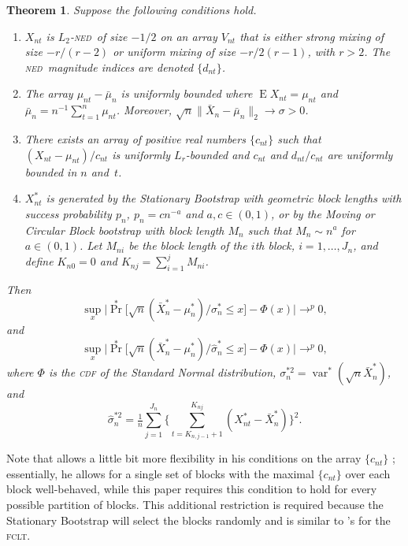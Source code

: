 \documentclass[11pt]{article}
\newcommand\citepos[2][]{\citeauthor{#2}'s \citeyearpar[#1]{#2}}
\newtheorem{thm}{Theorem}
\theoremstyle{definition}
\DeclareMathOperator{\E}{E}
\DeclareMathOperator{\pr}{Pr}
\DeclareMathOperator{\var}{var}
\newcommand{\fclt}{\textsc{fclt}}
\newcommand{\ned}{\textsc{ned}}
\begin{document}
\begin{thm}\label{thm:1}
  Suppose the following conditions hold.
  \begin{enumerate}
  \item $X_{nt}$ is $L_2$-\ned\ of size $-1/2$ on an array
    $V_{nt}$ that is either strong mixing of size $-r/(r-2)$ or
    uniform mixing of size $-r/2(r-1)$, with $r > 2$.  The
    \ned\ magnitude indices are denoted $\{d_{nt}\}$.
  \item The array $\mu_{nt} - \bar \mu_n$ is uniformly bounded where
    $\E X_{nt} = \mu_{nt}$ and $\bar{\mu}_n = n^{-1} \sum_{t=1}^n
    \mu_{nt}$.  Moreover, $\sqrt{n} \| \bar{X}_{n} - \bar\mu_n \|_2
    \to \sigma > 0$.
  \item There exists an array of positive real numbers $\{c_{nt}\}$
    such that $(X_{nt} - \mu_{nt})/c_{nt}$ is uniformly $L_r$-bounded
    and $c_{nt}$ and $d_{nt}/c_{nt}$ are uniformly bounded in $n$
    and~$t$.
  \item $X_{nt}^{*}$ is generated by the Stationary Bootstrap with
    geometric block lengths with success probability $p_n$, $p_n = c
    n^{-a}$ and $a,c \in (0,1)$, or by the Moving or Circular Block
    bootstrap with block length $M_n$ such that $M_n \sim n^a$ for 
    $a \in (0,1)$.  Let $M_{ni}$ be the block length of the $i$th
    block, $i=1,\dots,J_n$, and define $K_{n0} = 0$ and $K_{nj} =
    \sum_{i=1}^j M_{ni}$.
  \end{enumerate}
  Then
  \begin{equation}\label{eq:30}
    \sup_x \big\lvert \pr^{*}\big[\sqrt{n}(\bar X_{n}^{*} - \mu_{n}^{*}) \big/
    \sigma_n^{*} \leq x \big] - \Phi(x) \big\rvert \to^p 0,
  \end{equation}
  and
  \begin{equation}
    \label{eq:9}
    \sup_x \big\lvert \pr^{*}\big[
    \sqrt{n}(\bar X_{n}^{*} - \mu_{n}^{*}) \big/ \hat\sigma_n^{*}
    \leq x \big] - \Phi(x) \big\rvert \to^p 0,
  \end{equation}
  where $\Phi$ is the \textsc{cdf} of the Standard Normal
  distribution, $\sigma_n^{*2} = \var^{*}(\sqrt{n} \bar X_n^{*})$, and
    \begin{equation}
      \label{eq:12}
      \hat{\sigma}_n^{*2} = \tfrac{1}{n} \sum_{j=1}^{J_n}
      \Big\{\sum_{t=K_{n,j-1}+1}^{K_{nj}} (X_{nt}^{*} - \bar X_{n}^{*})\Big\}^2.
    \end{equation}
\end{thm}

Note that \citet{Jon:97} allows a little bit more flexibility in his
conditions on the array $\{c_{nt}\}$ \citep[see also][]{Dav:93};
essentially, he allows for a single set of blocks with the
maximal $\{c_{nt}\}$ over each block well-behaved, while this
paper requires this condition to hold for every possible partition of
blocks.  This additional restriction is required because the
Stationary Bootstrap will select the blocks randomly and is similar to
\citepos{JoD:00b} for the \fclt.
\end{document}
